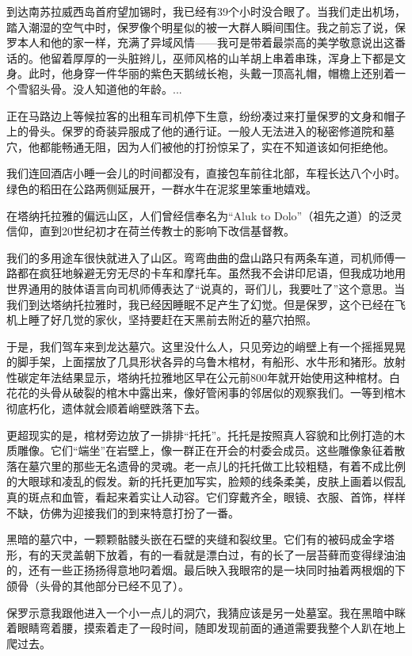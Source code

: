 \documentclass[12pt,oneside]{book}
\begin{document}
\begin{bookref}[frametitle={\cite{好好告别}}]
到达南苏拉威西岛首府望加锡时，我已经有39个小时没合眼了。当我们走出机场，踏入潮湿的空气中时，保罗像个明星似的被一大群人瞬间围住。我之前忘了说，保罗本人和他的家一样，充满了异域风情——我可是带着最崇高的美学敬意说出这番话的。他留着厚厚的一头脏辫儿，巫师风格的山羊胡上串着串珠，浑身上下都是文身。此时，他身穿一件华丽的紫色天鹅绒长袍，头戴一顶高礼帽，帽檐上还别着一个雪貂头骨。没人知道他的年龄。...

正在马路边上等候拉客的出租车司机停下生意，纷纷凑过来打量保罗的文身和帽子上的骨头。保罗的奇装异服成了他的通行证。一般人无法进入的秘密修道院和墓穴，他都能畅通无阻，因为人们被他的打扮惊呆了，实在不知道该如何拒绝他。

我们连回酒店小睡一会儿的时间都没有，直接包车前往北部，车程长达八个小时。绿色的稻田在公路两侧延展开，一群水牛在泥浆里笨重地嬉戏。

在塔纳托拉雅的偏远山区，人们曾经信奉名为“Aluk to Dolo”（祖先之道）的泛灵信仰，直到20世纪初才在荷兰传教士的影响下改信基督教。

我们的多用途车很快就进入了山区。弯弯曲曲的盘山路只有两条车道，司机师傅一路都在疯狂地躲避无穷无尽的卡车和摩托车。虽然我不会讲印尼语，但我成功地用世界通用的肢体语言向司机师傅表达了“说真的，哥们儿，我要吐了”这个意思。当我们到达塔纳托拉雅时，我已经因睡眠不足产生了幻觉。但是保罗，这个已经在飞机上睡了好几觉的家伙，坚持要赶在天黑前去附近的墓穴拍照。

于是，我们驾车来到龙达墓穴。这里没什么人，只见旁边的峭壁上有一个摇摇晃晃的脚手架，上面摆放了几具形状各异的乌鲁木棺材，有船形、水牛形和猪形。放射性碳定年法结果显示，塔纳托拉雅地区早在公元前800年就开始使用这种棺材。白花花的头骨从破裂的棺木中露出来，像好管闲事的邻居似的观察我们。一等到棺木彻底朽化，遗体就会顺着峭壁跌落下去。

更超现实的是，棺材旁边放了一排排“托托”。托托是按照真人容貌和比例打造的木质雕像。它们“端坐”在岩壁上，像一群正在开会的村委会成员。这些雕像象征着散落在墓穴里的那些无名遗骨的灵魂。老一点儿的托托做工比较粗糙，有着不成比例的大眼球和凌乱的假发。新的托托更加写实，脸颊的线条柔美，皮肤上画着以假乱真的斑点和血管，看起来着实让人动容。它们穿戴齐全，眼镜、衣服、首饰，样样不缺，仿佛为迎接我们的到来特意打扮了一番。

黑暗的墓穴中，一颗颗骷髅头嵌在石壁的夹缝和裂纹里。它们有的被码成金字塔形，有的天灵盖朝下放着，有的一看就是漂白过，有的长了一层苔藓而变得绿油油的，还有一些正扬扬得意地叼着烟。最后映入我眼帘的是一块同时抽着两根烟的下颌骨（头骨的其他部分已经不见了）。

保罗示意我跟他进入一个小一点儿的洞穴，我猜应该是另一处墓室。我在黑暗中眯着眼睛弯着腰，摸索着走了一段时间，随即发现前面的通道需要我整个人趴在地上爬过去。


\end{bookref}
\end{document}
